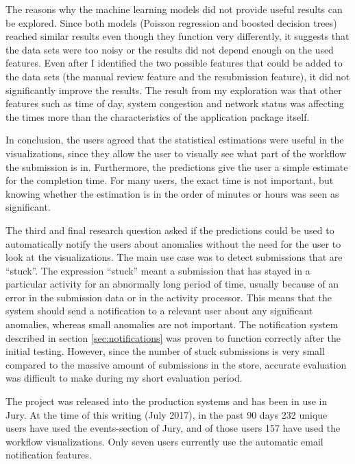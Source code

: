 
The reasons why the machine learning models did not provide useful results can be explored.
Since both models (Poisson regression and boosted decision trees) reached similar results even though they function very differently, it suggests that the data sets were too noisy or the results did not depend enough on the used features.
Even after I identified the two possible features that could be added to the data sets (the manual review feature and the resubmission feature), it did not significantly improve the results.
The result from my exploration was that other features such as time of day, system congestion and network status was affecting the times more than the characteristics of the application package itself.

In conclusion, the users agreed that the statistical estimations were useful in the visualizations, since they allow the user to visually see what part of the workflow the submission is in.
Furthermore, the predictions give the user a simple estimate for the completion time. 
For many users, the exact time is not important, but knowing whether the estimation is in the order of minutes or hours was seen as significant.


The third and final research question asked if the predictions could be used to automatically notify the users about anomalies without the need for the user to look at the visualizations.
The main use case was to detect submissions that are ``stuck''.
The expression ``stuck'' meant a submission that has stayed in a particular activity for an abnormally long period of time, usually because of an error in the submission data or in the activity processor.
This means that the system should send a notification to a relevant user about any significant anomalies, whereas small anomalies are not important.
The notification system described in section \ref{sec:notifications} was proven to function correctly after the initial testing. 
However, since the number of stuck submissions is very small compared to the massive amount of submissions in the store, accurate evaluation was difficult to make during my short evaluation period.

The project was released into the production systems and has been in use in Jury.
At the time of this writing (July 2017), in the past 90 days 232 unique users have used the events-section of Jury, and of those users 157 have used the workflow visualizations.
Only seven users currently use the automatic email notification features.

